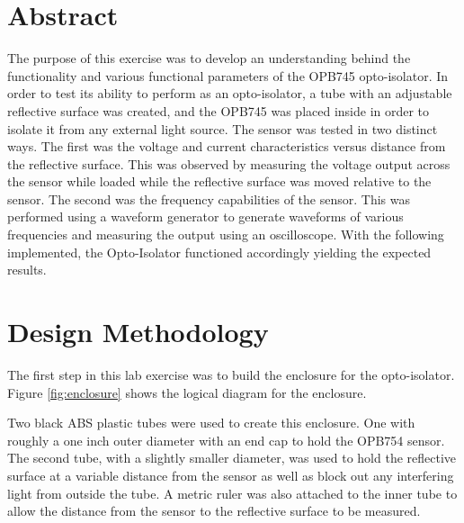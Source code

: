 \documentclass[CMPE]{KGCOEReport}
\begin{document}
\maketitle

\renewcommand\cftsecleader{\cftdotfill{\cftdotsep}} %
\tableofcontents
\newpage
\setcounter{secnumdepth}{0} %
\renewcommand\um{$\mu$m} %
\newcommand\ua{$\mu$a }
\newcommand{\ol}[1]{\overline{#1}}

\section{Abstract}
The purpose of this exercise was to develop an understanding behind the 
functionality and various functional parameters of the OPB745 
opto-isolator. In order to test its ability to perform as an opto-isolator,
a tube with an adjustable reflective surface was created, and the OPB745 was placed inside in order to isolate it from any 
external light source. The sensor was tested in two distinct ways. The first was the voltage and current characteristics
versus distance from the reflective surface. This was observed by measuring the voltage output across the sensor 
while loaded while the reflective surface was moved relative to the sensor. The second was the frequency capabilities 
of the sensor. This was performed using a waveform generator to generate waveforms of various frequencies and measuring 
the output using an oscilloscope. With the following implemented, the Opto-Isolator functioned accordingly yielding the expected results. 


\section{Design Methodology}
The first step in this lab exercise was to build the enclosure for the opto-isolator. 
Figure \ref{fig:enclosure} shows the logical diagram for the enclosure. 


Two black ABS plastic tubes were used to create this enclosure. One with roughly a 
one inch outer diameter with an end cap to hold the OPB754 sensor. The second 
tube, with a slightly smaller diameter, was used to hold the reflective surface
at a variable distance from the sensor as well as block out any interfering light from outside
the tube. A metric ruler was also attached to the inner tube to allow the distance from the
sensor to the reflective surface to be measured.\\
\end{document}

